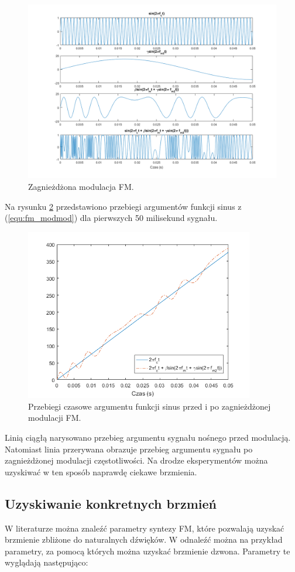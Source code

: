 \begin{figure}[H]
	\centering
	\includegraphics[width=14cm]{grafiki/fm_modmod}
	\captionsetup{justification=centering}
	\caption{Zagnieżdżona modulacja FM.}
	\label{rys:fm_modmod}
\end{figure}
Na rysunku \ref{rys:fm_arg2} przedstawiono przebiegi argumentów funkcji sinus z (\ref{equ:fm_modmod}) dla pierwszych 50 milisekund sygnału.
\begin{figure}[H]
	\centering
	\includegraphics[width=10cm]{grafiki/fm_arg2}
	\captionsetup{justification=centering}
	\caption{Przebiegi czasowe argumentu funkcji sinus przed i po zagnieżdżonej modulacji FM.}
	\label{rys:fm_arg2}
\end{figure}
Linią ciągłą narysowano przebieg argumentu sygnału nośnego przed modulacją. Natomiast linia przerywana obrazuje przebieg argumentu sygnału po zagnieżdżonej modulacji częstotliwości. Na drodze eksperymentów można uzyskiwać w ten sposób naprawdę ciekawe brzmienia.
\subsection{Uzyskiwanie konkretnych brzmień}
W literaturze można znaleźć parametry syntezy FM, które pozwalają uzyskać brzmienie zbliżone do naturalnych dźwięków. W \cite{chowning} odnaleźć można na przykład parametry, za pomocą których można uzyskać brzmienie dzwona. Parametry te wyglądają następująco:

